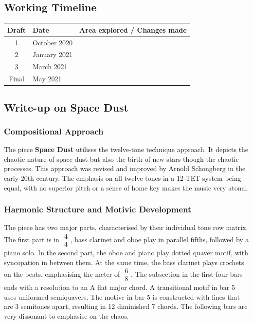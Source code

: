 \documentclass{article}
\begin{document}
\newpage

\subsection{Working Timeline}
\begin{center}
	\def\arraystretch{1.5}
\begin{tabular}{|c|l|l|}
	\hline
	Draft&Date&Area explored / Changes made\\
	\hline
	1&October 2020&
    \\
	\hline
	2&January 2021&\\
	\hline
	3&March 2021&\\
	\hline
	Final&May 2021&\\
	\hline
\end{tabular}
\end{center}

\subsection{Write-up on {\bf Space Dust}}

\subsubsection{Compositional Approach}

The piece \textbf{Space Dust} utilises the twelve-tone technique approach. It
depicts the chaotic nature of space dust but also the birth of new stars though
the chaotic processes. This approach was revised and improved by Arnold
Schongberg in the early 20th century. The emphasis on all twelve tones in a
12-TET system being equal, with no superior pitch or a sense of home key makes
the music very atonal.

\subsubsection{Harmonic Structure and Motivic Development}

The piece has two major parts, characterised by their individual tone row
matrix. The first part is in \(\begin{array}{c}4\\4\end{array}\), bass clarinet and oboe play in parallel fifths,
followed by a piano solo. In the second part, the oboe and piano play dotted
quaver motif, with syncopation in between them. At the same time, the bass
clarinet plays crochets on the beats, emphasising the meter of
\(\begin{array}{c}6\\8\end{array}\).  The subsection in the first four bars ends
	with a resolution to an A flat major chord. A transitional motif in bar
	5 uses uniformed semiquavers. The motive in bar 5 is constructed with
	lines that are 3 semitones apart, resulting in 12 diminished 7 chords.
	The following bars are very dissonant to emphasise on the chaos.
\end{document}
